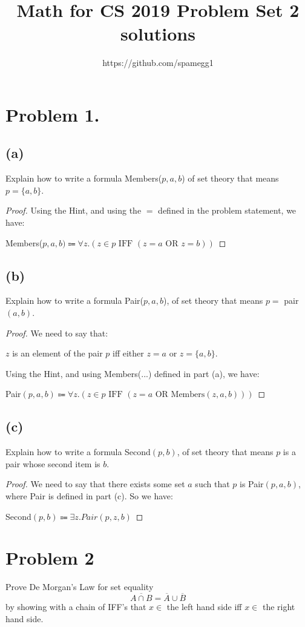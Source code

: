 \documentclass[14pt]{extarticle}
\title{Math for CS 2019 Problem Set 2 solutions}
\author{https://github.com/spamegg1}
\begin{document}
\maketitle
\tableofcontents

\section{Problem 1.}

\subsection{(a)}
Explain how to write a formula Members($p, a, b$) of set theory that means $p = \{a, b\}$.
\begin{proof}
Using the Hint, and using the $=$ defined in the problem statement, we have:

Members($p, a, b) \Coloneqq \forall z.(z \in p \text{ IFF } (z = a \text{ OR } z = b))$
\end{proof}

\subsection{(b)} Explain how to write a formula Pair($p, a, b$), of set theory that means $p = $ pair$(a, b)$.
\begin{proof}
We need to say that: 

$z$ is an element of the pair $p$ iff either $z = a$ or $z = \{a, b\}$.

Using the Hint, and using Members(...) defined in part (a), we have:

Pair$(p, a, b) \Coloneqq \forall z.(z \in p \text{ IFF } (z = a \text{ OR Members}(z, a, b)))$
\end{proof}

\subsection{(c)} Explain how to write a formula Second$(p, b)$, of set theory that means $p$ is a pair whose second item is $b$.
\begin{proof}
We need to say that there exists some set $a$ such that $p$ is Pair$(p, a, b)$, where Pair is defined in part (c). So we have:

Second$(p, b) \Coloneqq \exists z. Pair(p, z, b)$
\end{proof}

\section{Problem 2}
Prove De Morgan’s Law for set equality 
$$
\overline{A \cap B} = \overline{A} \cup \overline{B}
$$
by showing with a chain of IFF’s that $x \in$ the left hand side iff $x  \in$ the right hand side. 
\end{document}
